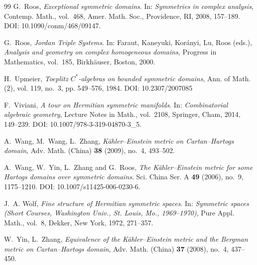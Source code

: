\documentclass[reqno, 11pt]{amsart}
\begin{document}
\begin{thebibliography}{99}
\label{RoosBook2000Exceptional}
G.~Roos, \textit{Exceptional symmetric domains}. In: \textit{Symmetries in complex analysis}, Contemp. Math., vol.~468, Amer. Math. Soc., Providence, RI, 2008, 157--189. DOI: 10.1090/conm/468/09147.


\label{ROOSinFarautKoranyiRoosBook2000}
G.~Roos, \textit{Jordan Triple Systems}. In: Faraut, Kaneyuki, Kor\'{a}nyi, Lu, Roos (eds.), \textit{Analysis and geometry on complex homogeneous domains}, Progress in Mathematics, vol.~185, Birkh\"{a}user, Boston, 2000.


H.~Upmeier, \emph{Toeplitz $C^*\!$-algebras on bounded symmetric domains},
  Ann. of Math. (2), vol. 119, no.~3, pp. 549--576, 1984. DOI: 10.2307/2007085



\label{VivianiBook2014HSS}
F.~Viviani, \textit{A tour on Hermitian symmetric manifolds}. In: \textit{Combinatorial algebraic geometry}, Lecture Notes in Math., vol.~2108, Springer, Cham, 2014, 149--239. DOI: 10.1007/978-3-319-04870-3\_5.


A.~Wang, M.~Wang, L.~Zhang,
\emph{K\"ahler--Einstein metric on Cartan--Hartogs domain},
Adv. Math. (China) \textbf{38} (2009), no.~4, 493--502.


\label{WANGYINZHANGROSS2006KEonHartogs}
A.~Wang, W.~Yin, L.~Zhang and G.~Roos, \textit{The K\"{a}hler--Einstein metric for some Hartogs domains over symmetric domains}. Sci. China Ser. A \textbf{49} (2006), no.~9, 1175--1210. DOI: 10.1007/s11425-006-0230-6.

\label{WolfBook1969FineStructureHSSpolydisc}
J.~A. Wolf, \textit{Fine structure of Hermitian symmetric spaces}. In: \textit{Symmetric spaces (Short Courses, Washington Univ., St. Louis, Mo., 1969--1970)}, Pure Appl. Math., vol.~8, Dekker, New York, 1972, 271--357.


W.~Yin, L.~Zhang,
\emph{Equivalence of the K\"ahler--Einstein metric and the Bergman metric on Cartan--Hartogs domain},
Adv. Math. (China) \textbf{37} (2008), no.~4, 437--450.



\end{thebibliography}
\end{document}
